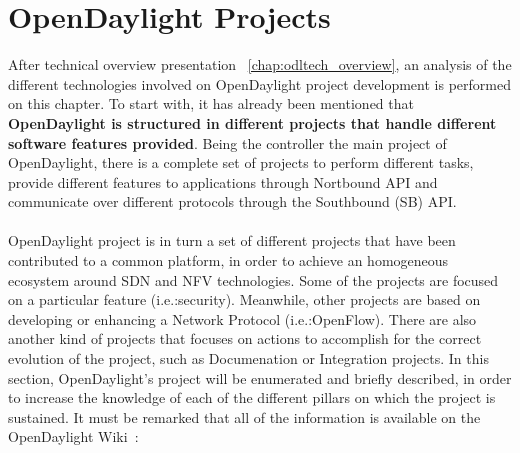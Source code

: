 \documentclass[a4paper, 12pt]{book}
\begin{document}
\section{OpenDaylight Projects}
\label{chap:odltech_projects}
After technical overview presentation ~\ref{chap:odltech_overview}, an analysis of the different technologies involved on OpenDaylight project development is performed on this chapter. To start with, it has already been mentioned that \textbf{OpenDaylight is structured in different projects that handle different software features provided}. Being the controller the main project of OpenDaylight, there is a complete set of projects to perform different tasks, provide different features to applications through Nortbound API and communicate over different protocols through the Southbound (SB) API.\\
\\
OpenDaylight project is in turn a set of different projects that have been contributed to a common platform, in order to achieve an homogeneous ecosystem around SDN and NFV technologies. Some of the projects are focused on a particular feature (i.e.:security). Meanwhile, other projects are based on developing or enhancing a Network Protocol (i.e.:OpenFlow). There are also another kind of projects that focuses on actions to accomplish for the correct evolution of the project, such as Documenation or Integration projects. In this section, OpenDaylight's project will be enumerated and briefly described, in order to increase the knowledge of each of the different pillars on which the project is sustained. It must be remarked that all of the information is available on the OpenDaylight Wiki~\cite{OpenDaylightWiki}:
\end{document}
